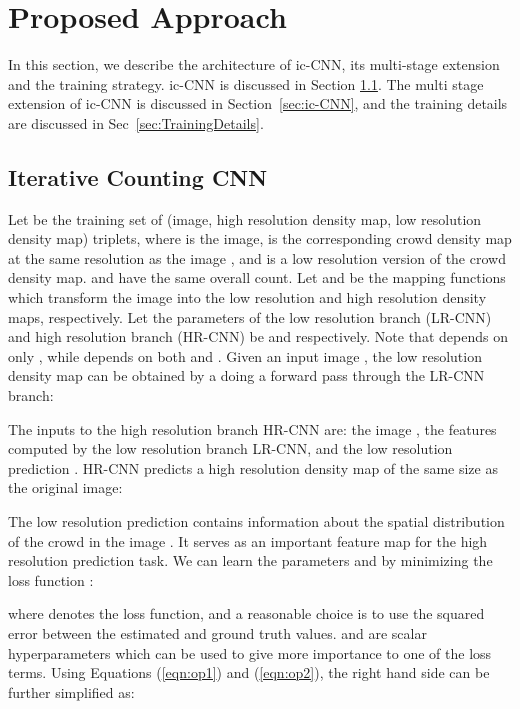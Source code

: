 \documentclass[runningheads]{llncs}
\begin{document}
\section{Proposed Approach}
In this section, we describe the architecture of ic-CNN, its multi-stage extension
and the training strategy.
ic-CNN is discussed in Section \ref{sec:BasicCountingBlock}. 
The multi stage extension of ic-CNN is discussed in Section~\ref{sec:ic-CNN}, and the training details are discussed in Sec~\ref{sec:TrainingDetails}.

 
\subsection{Iterative Counting CNN}\label{sec:BasicCountingBlock}

Let  be the training set of  (image, high resolution density map, low resolution density map) triplets, where  is the  image,  is the corresponding crowd density map at the same resolution as the image , and  is a low resolution version of the crowd density map.  and  have the same overall count. Let  and  be the mapping functions which transform the image into the low resolution and high resolution density maps, respectively. Let the parameters of the low resolution branch (LR-CNN) and high resolution branch (HR-CNN) be  and  respectively. Note that  depends on only , while  depends on both  and . Given an input image , the low resolution density map  can be obtained by a doing a forward pass through the LR-CNN branch:

The inputs to the high resolution branch HR-CNN are: the image , the features computed by the low resolution branch LR-CNN, and the low resolution prediction . HR-CNN predicts a high resolution density map of the same size as the original image:


The low resolution prediction  contains information about the spatial distribution of the crowd in the image . It serves as an important feature map for the high resolution prediction task. We can learn the parameters   and  by minimizing
the loss function :

where  denotes the loss function, and a reasonable choice is to use the squared error between the estimated and ground truth values.  and   are scalar hyperparameters which can be used to give more importance to one of the loss terms.
Using Equations (\ref{eqn:op1}) and (\ref{eqn:op2}), the right hand side can be further simplified as:
\end{document}
